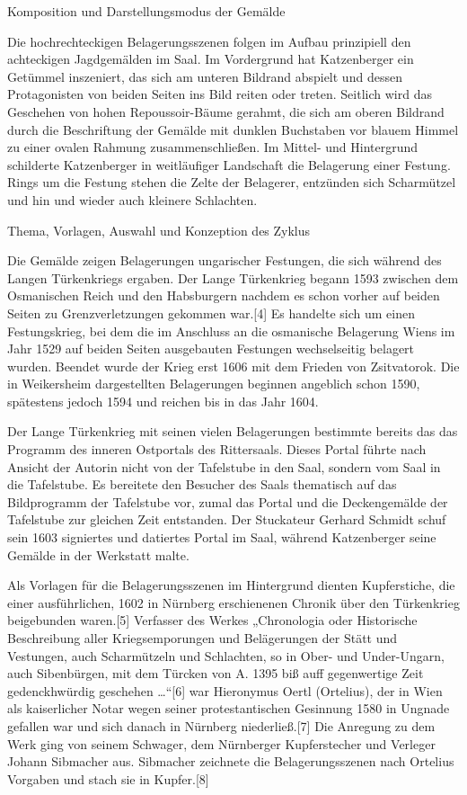 \documentclass[
  a4paper,
  portrait]{book}
\begin{document}
Komposition und Darstellungsmodus der Gemälde

Die hochrechteckigen Belagerungsszenen folgen im Aufbau prinzipiell den
achteckigen Jagdgemälden im Saal. Im Vordergrund hat Katzenberger ein
Getümmel inszeniert, das sich am unteren Bildrand abspielt und dessen
Protagonisten von beiden Seiten ins Bild reiten oder treten. Seitlich
wird das Geschehen von hohen Repoussoir-Bäume gerahmt, die sich am
oberen Bildrand durch die Beschriftung der Gemälde mit dunklen
Buchstaben vor blauem Himmel zu einer ovalen Rahmung zusammenschließen.
Im Mittel- und Hintergrund schilderte Katzenberger in weitläufiger
Landschaft die Belagerung einer Festung. Rings um die Festung stehen die
Zelte der Belagerer, entzünden sich Scharmützel und hin und wieder auch
kleinere Schlachten.

Thema, Vorlagen, Auswahl und Konzeption des Zyklus

Die Gemälde zeigen Belagerungen ungarischer Festungen, die sich während
des Langen Türkenkriegs ergaben. Der Lange Türkenkrieg begann 1593
zwischen dem Osmanischen Reich und den Habsburgern nachdem es schon
vorher auf beiden Seiten zu Grenzverletzungen gekommen war.{[}4{]} Es
handelte sich um einen Festungskrieg, bei dem die im Anschluss an die
osmanische Belagerung Wiens im Jahr 1529 auf beiden Seiten ausgebauten
Festungen wechselseitig belagert wurden. Beendet wurde der Krieg erst
1606 mit dem Frieden von Zsitvatorok. Die in Weikersheim dargestellten
Belagerungen beginnen angeblich schon 1590, spätestens jedoch 1594 und
reichen bis in das Jahr 1604.

Der Lange Türkenkrieg mit seinen vielen Belagerungen bestimmte bereits
das das Programm des inneren Ostportals des Rittersaals. Dieses Portal
führte nach Ansicht der Autorin nicht von der Tafelstube in den Saal,
sondern vom Saal in die Tafelstube. Es bereitete den Besucher des Saals
thematisch auf das Bildprogramm der Tafelstube vor, zumal das Portal und
die Deckengemälde der Tafelstube zur gleichen Zeit entstanden. Der
Stuckateur Gerhard Schmidt schuf sein 1603 signiertes und datiertes
Portal im Saal, während Katzenberger seine Gemälde in der Werkstatt
malte.

Als Vorlagen für die Belagerungsszenen im Hintergrund dienten
Kupferstiche, die einer ausführlichen, 1602 in Nürnberg erschienenen
Chronik über den Türkenkrieg beigebunden waren.{[}5{]} Verfasser des
Werkes „Chronologia oder Historische Beschreibung aller Kriegsemporungen
und Belägerungen der Stätt und Vestungen, auch Scharmützeln und
Schlachten, so in Ober- und Under-Ungarn, auch Sibenbürgen, mit dem
Türcken von A. 1395 biß auff gegenwertige Zeit gedenckhwürdig geschehen
\ldots``{[}6{]} war Hieronymus Oertl (Ortelius), der in Wien als
kaiserlicher Notar wegen seiner protestantischen Gesinnung 1580 in
Ungnade gefallen war und sich danach in Nürnberg niederließ.{[}7{]} Die
Anregung zu dem Werk ging von seinem Schwager, dem Nürnberger
Kupferstecher und Verleger Johann Sibmacher aus. Sibmacher zeichnete die
Belagerungsszenen nach Ortelius Vorgaben und stach sie in Kupfer.{[}8{]}
\end{document}
